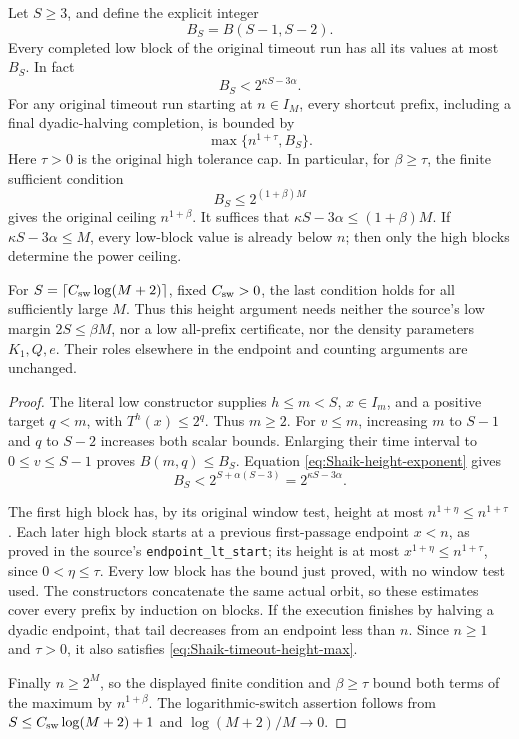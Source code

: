 \begin{corollary}
\label{cor:Shaik-timeout-height-refinement}
Let \(S\ge3\), and define the explicit integer
\[
 B_S=B(S-1,S-2).
\]
Every completed low block of the original timeout run has all its values
at most \(B_S\). In fact
\begin{equation}\label{eq:Shaik-timeout-low-height}
 B_S<2^{\kappa S-3\alpha}.
\end{equation}
For any original timeout run starting at \(n\in I_M\), every shortcut
prefix, including a final dyadic-halving completion, is bounded by
\begin{equation}\label{eq:Shaik-timeout-height-max}
 \max\{n^{1+\tau},B_S\}.
\end{equation}
Here \(\tau>0\) is the original high tolerance cap. In particular, for
\(\beta\ge\tau\), the finite sufficient condition
\[
 B_S\le2^{(1+\beta)M}
\]
gives the original ceiling \(n^{1+\beta}\). It suffices that
\(\kappa S-3\alpha\le(1+\beta)M\). If
\(\kappa S-3\alpha\le M\), every low-block value is already below \(n\);
then only the high blocks determine the power ceiling.

For \(S=\lceil C_{\rm sw}\log(M+2)\rceil\), fixed \(C_{\rm sw}>0\), the
last condition holds for all sufficiently large \(M\). Thus this height
argument needs neither the source's low margin \(2S\le\beta M\), nor a
low all-prefix certificate, nor the density parameters \(K_1,Q,e\).
Their roles elsewhere in the endpoint and counting arguments are unchanged.
\end{corollary}
\begin{proof}
The literal low constructor supplies \(h\le m<S\),
\(x\in I_m\), and a positive target \(q<m\), with \(T^h(x)\le2^q\).
Thus \(m\ge2\). For \(v\le m\), increasing \(m\) to \(S-1\) and \(q\)
to \(S-2\) increases both scalar bounds. Enlarging their time interval
to \(0\le v\le S-1\) proves \(B(m,q)\le B_S\). Equation
\eqref{eq:Shaik-height-exponent} gives
\[
 B_S<2^{S+\alpha(S-3)}=2^{\kappa S-3\alpha}.
\]

The first high block has, by its original window test, height at most
\(n^{1+\eta}\le n^{1+\tau}\). Each later high block starts at a previous
first-passage endpoint \(x<n\), as proved in the source's
\texttt{endpoint\_lt\_start}; its height is at most
\(x^{1+\eta}\le n^{1+\tau}\), since \(0<\eta\le\tau\).
Every low block has the bound just proved, with no window test used.
The constructors concatenate the same actual orbit, so these estimates
cover every prefix by induction on blocks. If the execution finishes
by halving a dyadic endpoint, that tail decreases from an endpoint
less than \(n\). Since \(n\ge1\) and \(\tau>0\), it also satisfies
\eqref{eq:Shaik-timeout-height-max}.

Finally \(n\ge2^M\), so the displayed finite condition and \(\beta\ge\tau\)
bound both terms of the maximum by \(n^{1+\beta}\).
The logarithmic-switch assertion follows from
\(S\le C_{\rm sw}\log(M+2)+1\) and
\(\log(M+2)/M\longrightarrow0\).
\end{proof}

